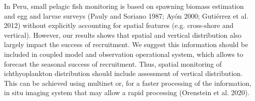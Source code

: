 In Peru, small pelagic fish monitoring is based on spawning biomass estimation and egg and larvae surveys (Pauly and Soriano 1987; Ayón 2000; Gutiérrez et al. 2012) without explicitly accounting for spatial features (e.g. cross-shore and vertical). However, our results shows that spatial and vertical distribution also largely impact the success of recruitment. We suggest this information should be included in coupled model and observation operational system, which allows to forecast the seasonal success of recruitment. Thus, spatial monitoring of ichthyoplankton distribution should include assessment of vertical distribution. This can be achieved using multinet or, for a faster processing of the information, in situ imaging system that may allow a rapid processing (Orenstein et al. 2020).\\